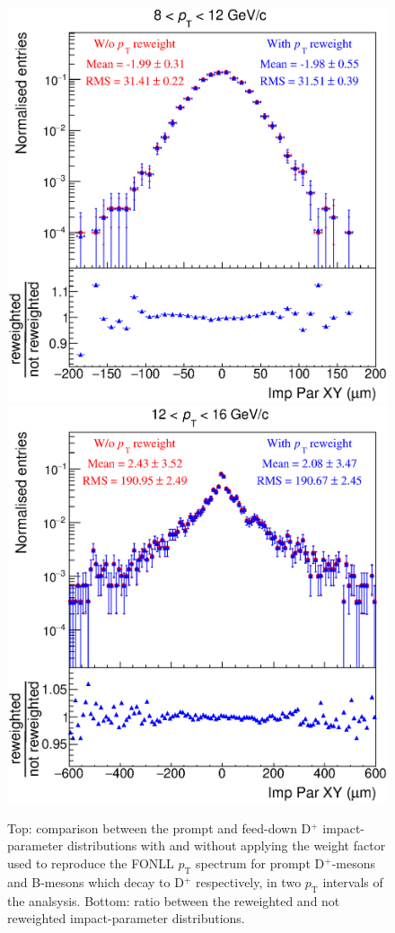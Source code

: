\documentclass[b5paper,10pt,twoside,oldstyle,classica]{toptesi}
\newcommand{\pt}{p_\text{T}}
\begin{document}
\begin{figure}[tb]
\begin{center}
{\includegraphics[scale = 0.3]{ImpParPrompt_8-12_PtRewComp.eps}}
\hspace{-0.6cm}
{\includegraphics[scale = 0.3]{ImpParTrueFD_12-16_PtRewComp.eps}}
\caption{Top: comparison between the prompt and feed-down D$^+$ impact-parameter distributions with and without applying the weight factor used to reproduce the FONLL $\pt$ spectrum for prompt D$^+$-mesons and B-mesons which decay to D$^+$ respectively, in two $\pt$ intervals of the analsysis. Bottom: ratio between the reweighted and not reweighted impact-parameter distributions.}
\label{ptrew_syst}
\end{center}
\end{figure}
\end{document}
